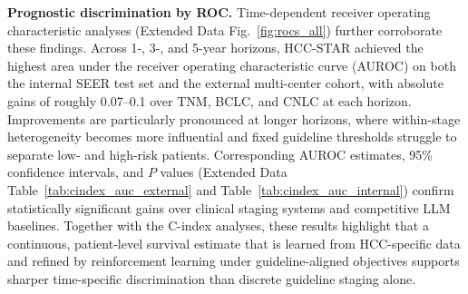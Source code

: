 \documentclass{article}
\begin{document}

\textbf{Prognostic discrimination by ROC.}
Time-dependent receiver operating characteristic analyses (Extended Data Fig.~\ref{fig:rocs_all}) further corroborate these findings. Across 1-, 3-, and 5-year horizons, HCC-STAR achieved the highest area under the receiver operating characteristic curve (AUROC) on both the internal SEER test set and the external multi-center cohort, with absolute gains of roughly 0.07–0.1 over TNM, BCLC, and CNLC at each horizon. Improvements are particularly pronounced at longer horizons, where within-stage heterogeneity becomes more influential and fixed guideline thresholds struggle to separate low- and high-risk patients. Corresponding AUROC estimates, 95\% confidence intervals, and $P$ values (Extended Data Table~\ref{tab:cindex_auc_external} and Table~\ref{tab:cindex_auc_internal}) confirm statistically significant gains over clinical staging systems and competitive LLM baselines. Together with the C-index analyses, these results highlight that a continuous, patient-level survival estimate that is learned from HCC-specific data and refined by reinforcement learning under guideline-aligned objectives supports sharper time-specific discrimination than discrete guideline staging alone.
\end{document}
